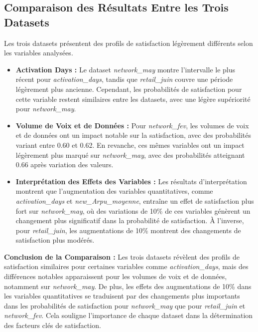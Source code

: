 \subsection{Comparaison des Résultats Entre les Trois Datasets}

Les trois datasets présentent des profils de satisfaction légèrement différents selon les variables analysées.

\begin{itemize}
    \item \textbf{Activation Days :} Le dataset \textit{network\_may} montre l'intervalle le plus récent pour \textit{activation\_days}, tandis que \textit{retail\_juin} couvre une période légèrement plus ancienne. Cependant, les probabilités de satisfaction pour cette variable restent similaires entre les datasets, avec une légère supériorité pour \textit{network\_may}.
    
    \item \textbf{Volume de Voix et de Données :} Pour \textit{network\_fev}, les volumes de voix et de données ont un impact notable sur la satisfaction, avec des probabilités variant entre 0.60 et 0.62. En revanche, ces mêmes variables ont un impact légèrement plus marqué sur \textit{network\_may}, avec des probabilités atteignant 0.66 après variation des valeurs.
    
    \item \textbf{Interprétation des Effets des Variables :} Les résultats d'interprétation montrent que l'augmentation des variables quantitatives, comme \textit{activation\_days} et \textit{new\_Arpu\_moyenne}, entraîne un effet de satisfaction plus fort sur \textit{network\_may}, où des variations de 10\% de ces variables génèrent un changement plus significatif dans la probabilité de satisfaction. À l'inverse, pour \textit{retail\_juin}, les augmentations de 10\% montrent des changements de satisfaction plus modérés.
\end{itemize}

\textbf{Conclusion de la Comparaison :} Les trois datasets révèlent des profils de satisfaction similaires pour certaines variables comme \textit{activation\_days}, mais des différences notables apparaissent pour les volumes de voix et de données, notamment sur \textit{network\_may}. De plus, les effets des augmentations de 10\% dans les variables quantitatives se traduisent par des changements plus importants dans les probabilités de satisfaction pour \textit{network\_may} que pour \textit{retail\_juin} et \textit{network\_fev}. Cela souligne l'importance de chaque dataset dans la détermination des facteurs clés de satisfaction.

